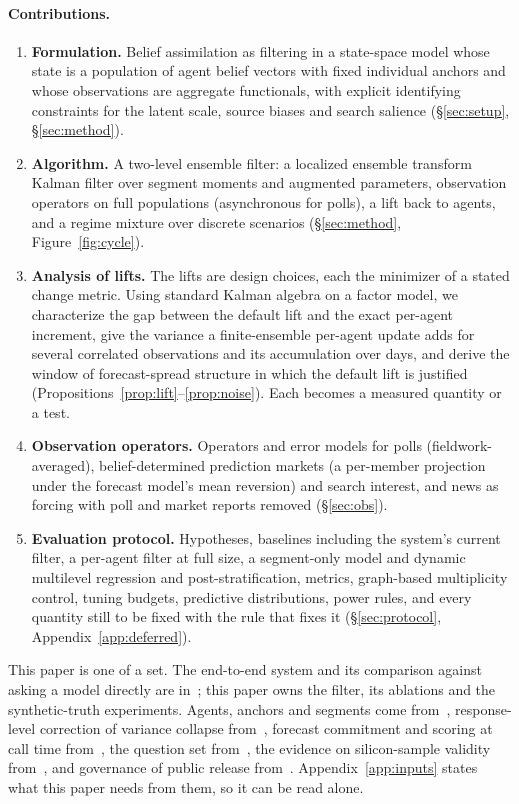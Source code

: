 \documentclass[10pt]{article}
\theoremstyle{remark}
\begin{document}
\paragraph{Contributions.}
\begin{enumerate}
  \item \textbf{Formulation.} Belief assimilation as filtering in a state-space model whose state is a population of agent belief vectors with fixed individual anchors and whose observations are aggregate functionals, with explicit identifying constraints for the latent scale, source biases and search salience (\S\ref{sec:setup}, \S\ref{sec:method}).
  \item \textbf{Algorithm.} A two-level ensemble filter: a localized ensemble transform Kalman filter over segment moments and augmented parameters, observation operators on full populations (asynchronous for polls), a lift back to agents, and a regime mixture over discrete scenarios (\S\ref{sec:method}, Figure~\ref{fig:cycle}).
  \item \textbf{Analysis of lifts.} The lifts are design choices, each the minimizer of a stated change metric. Using standard Kalman algebra on a factor model, we characterize the gap between the default lift and the exact per-agent increment, give the variance a finite-ensemble per-agent update adds for several correlated observations and its accumulation over days, and derive the window of forecast-spread structure in which the default lift is justified (Propositions~\ref{prop:lift}--\ref{prop:noise}). Each becomes a measured quantity or a test.
  \item \textbf{Observation operators.} Operators and error models for polls (fieldwork-averaged), belief-determined prediction markets (a per-member projection under the forecast model's mean reversion) and search interest, and news as forcing with poll and market reports removed (\S\ref{sec:obs}).
  \item \textbf{Evaluation protocol.} Hypotheses, baselines including the system's current filter, a per-agent filter at full size, a segment-only model and dynamic multilevel regression and post-stratification, metrics, graph-based multiplicity control, tuning budgets, predictive distributions, power rules, and every quantity still to be fixed with the rule that fixes it (\S\ref{sec:protocol}, Appendix~\ref{app:deferred}).
\end{enumerate}

This paper is one of a set. The end-to-end system and its comparison against asking a model directly are in~\cite{rw_askaworld}; this paper owns the filter, its ablations and the synthetic-truth experiments. Agents, anchors and segments come from~\cite{rw_unequally}, response-level correction of variance collapse from~\cite{rw_variance}, forecast commitment and scoring at call time from~\cite{rw_receipts}, the question set from~\cite{rw_bench}, the evidence on silicon-sample validity from~\cite{rw_sok}, and governance of public release from~\cite{rw_governing}. Appendix~\ref{app:inputs} states what this paper needs from them, so it can be read alone.
\end{document}

